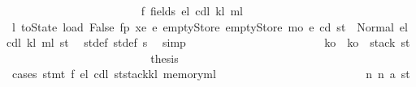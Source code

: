 \begin{isabellebody}
\ \ \ \ \ \ \ \ \ \ \ \ \ \ \ \ \ \ \ \ \ \ \isamarkupfalse%
\ f{}{\isacharcolon}{\kern0pt}\ {\isacharparenleft}{\kern0pt}fields\ e\isactrlsub l\ cd\isactrlsub l\ k\isactrlsub l\ m\isactrlsub l{\isacharparenright}{\kern0pt}\isanewline
\ \ \ \ \ \ \ \ \ \ \ \ \ \ \ \ \ \ \ \ \ \ \isamarkupfalse%
\ \isamarkupfalse%
\ l{}{\isacharcolon}{\kern0pt}\ {\isachardoublequoteopen}toState\ {\isacharparenleft}{\kern0pt}load\ False\ fp\ xe\ e{\isacharprime}{\kern0pt}\ emptyStore\ emptyStore\ m\isactrlsub o\ e\ cd{\isacharparenright}{\kern0pt}\ st{\isacharprime}{\kern0pt}\ {\isacharequal}{\kern0pt}\ Normal\ {\isacharparenleft}{\kern0pt}{\isacharparenleft}{\kern0pt}e\isactrlsub l{\isacharcomma}{\kern0pt}\ cd\isactrlsub l{\isacharcomma}{\kern0pt}\ k\isactrlsub l{\isacharcomma}{\kern0pt}\ m\isactrlsub l{\isacharparenright}{\kern0pt}{\isacharcomma}{\kern0pt}\ st{\isacharprime}{\kern0pt}{\isacharprime}{\kern0pt}{\isacharparenright}{\kern0pt}{\isachardoublequoteclose}\ \isamarkupfalse%
\ st{\isacharprime}{\kern0pt}{\isacharunderscore}{\kern0pt}def\ st{\isacharprime}{\kern0pt}{\isacharprime}{\kern0pt}{\isacharunderscore}{\kern0pt}def\ s{}\ \isamarkupfalse%
\ simp\isanewline
\ \ \ \ \ \ \ \ \ \ \ \ \ \ \ \ \ \ \ \ \ \ \isamarkupfalse%
\ k\isactrlsub o\ \ {\isachardoublequoteopen}k\isactrlsub o\ {\isacharequal}{\kern0pt}\ stack\ st{\isacharprime}{\kern0pt}{\isachardoublequoteclose}\isanewline
\ \ \ \ \ \ \ \ \ \ \ \ \ \ \ \ \ \ \ \ \ \ \isamarkupfalse%
\ \isamarkupfalse%
\ {\isacharquery}{\kern0pt}thesis\isanewline
\ \ \ \ \ \ \ \ \ \ \ \ \ \ \ \ \ \ \ \ \ \ \isamarkupfalse%
\ {\isacharparenleft}{\kern0pt}cases\ {\isachardoublequoteopen}stmt\ f\ e\isactrlsub l\ cd\isactrlsub l\ {\isacharparenleft}{\kern0pt}st{\isacharprime}{\kern0pt}{\isacharprime}{\kern0pt}{\isasymlparr}stack{\isacharcolon}{\kern0pt}{\isacharequal}{\kern0pt}k\isactrlsub l{\isacharcomma}{\kern0pt}\ memory{\isacharcolon}{\kern0pt}{\isacharequal}{\kern0pt}m\isactrlsub l{\isasymrparr}{\isacharparenright}{\kern0pt}{\isachardoublequoteclose}{\isacharparenright}{\kern0pt}\isanewline
\ \ \ \ \ \ \ \ \ \ \ \ \ \ \ \ \ \ \ \ \ \ \ \ \isamarkupfalse%
\ n{}{\isacharcolon}{\kern0pt}\ {\isacharparenleft}{\kern0pt}n\ a\ st{\isacharprime}{\kern0pt}{\isacharprime}{\kern0pt}{\isacharprime}{\kern0pt}{\isacharparenright}{\kern0pt}\isanewline
\ \ \ \ \ \ \ \ \ \ \ \ \ \ \ \ \ \ \ \ \ \ \ \ \isamarkupfalse%

\end{isabellebody}
